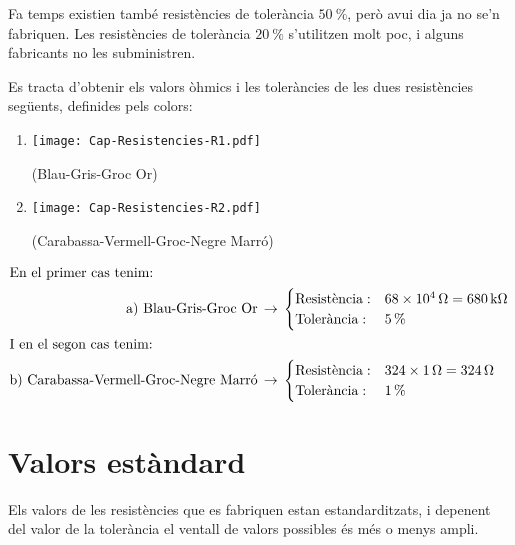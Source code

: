 Fa temps existien també resistències de tolerància $\SI{50}{\percent}$,
però avui dia ja no se'n fabriquen. Les resistències de tolerància $\SI{20}{\percent}$ s'utilitzen molt poc, i alguns fabricants no les subministren.


\begin{exemple}
   Es tracta d'obtenir els valors òhmics i les toleràncies de les dues resistències següents,
   definides pels colors:
    \begin{enumerate}
       \renewcommand{\labelenumi}{\alph{enumi})}
       \item \begin{minipage}{1.8cm}
               \texttt{[image: Cap-Resistencies-R1.pdf]}
            \end{minipage} (Blau-Gris-Groc Or)
       \item  \begin{minipage}{1.8cm}
               \texttt{[image: Cap-Resistencies-R2.pdf]}
            \end{minipage} (Carabassa-Vermell-Groc-Negre Marró)
    \end{enumerate}
    \begin{align*}
       \intertext{En el primer cas tenim:}
       \text{a) Blau-Gris-Groc Or}\,  &\rightarrow\,
       \begin{cases}
          \text{Resistència}: &\SI{68e4}{\ohm} = \SI{680}{k\ohm} \\
          \text{Tolerància}:  &\SI{5}{\percent}
       \end{cases} \\
       \intertext{I en el segon cas tenim:}
       \text{b) Carabassa-Vermell-Groc-Negre Marró}\,  &\rightarrow\,
       \begin{cases}
          \text{Resistència}: &324 \times \SI{1}{\ohm} = \SI{324}{\ohm} \\
          \text{Tolerància}:  &\SI{1}{\percent}
       \end{cases}
    \end{align*}
\end{exemple}

\section{Valors estàndard} 

Els valors de les resistències que es fabriquen estan estandarditzats, i depenent
del valor de la tolerància el ventall de valors possibles és més o menys ampli.


